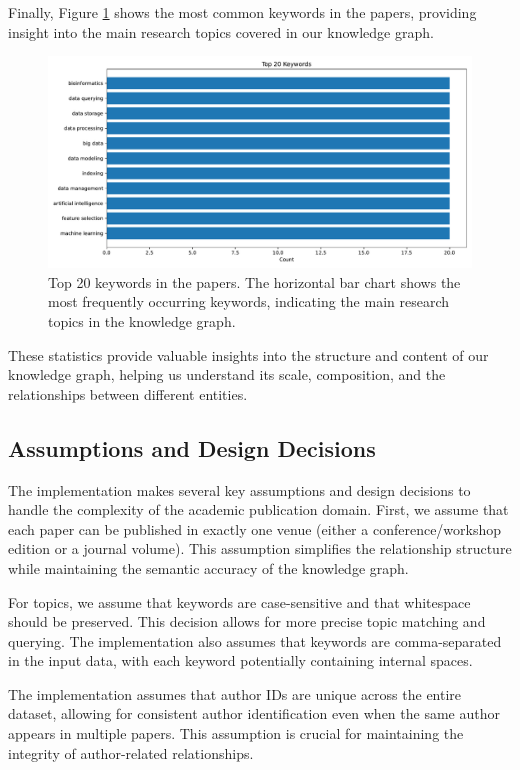 \documentclass[10pt,a4paper]{article}
\begin{document}
Finally, Figure \ref{fig:keyword_dist} shows the most common keywords in the papers, providing insight into the main research topics covered in our knowledge graph.

\begin{figure}[H]
    \centering
    \includegraphics[width=\textwidth]{img/keyword_distribution.pdf}
    \caption{Top 20 keywords in the papers. The horizontal bar chart shows the most frequently occurring keywords, indicating the main research topics in the knowledge graph.}
    \label{fig:keyword_dist}
\end{figure}

These statistics provide valuable insights into the structure and content of our knowledge graph, helping us understand its scale, composition, and the relationships between different entities.

\subsection{Assumptions and Design Decisions}

The implementation makes several key assumptions and design decisions to handle the complexity of the academic publication domain. First, we assume that each paper can be published in exactly one venue (either a conference/workshop edition or a journal volume). This assumption simplifies the relationship structure while maintaining the semantic accuracy of the knowledge graph.

For topics, we assume that keywords are case-sensitive and that whitespace should be preserved. This decision allows for more precise topic matching and querying. The implementation also assumes that keywords are comma-separated in the input data, with each keyword potentially containing internal spaces.

The implementation assumes that author IDs are unique across the entire dataset, allowing for consistent author identification even when the same author appears in multiple papers. This assumption is crucial for maintaining the integrity of author-related relationships.
\end{document}
